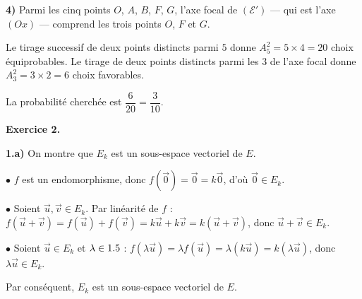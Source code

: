 \begin{illus}
\end{illus}

\smallskip
\noindent\textbf{4)} Parmi les cinq points $O$, $A$, $B$, $F$, $G$, l'axe focal de $(\mathcal{E}')$ — qui est
l'axe $(Ox)$ — comprend les trois points $O$, $F$ et $G$.

Le tirage successif de deux points distincts parmi $5$ donne $A_5^2=5\times4=20$ choix
équiprobables. Le tirage de deux points distincts parmi les $3$ de l'axe focal donne
$A_3^2=3\times2=6$ choix favorables.

La probabilité cherchée est $\dfrac{6}{20}=\boxed{\dfrac{3}{10}}$.

\bigskip
\noindent\textbf{Exercice 2.}

\smallskip
\noindent\textbf{1.a)} On montre que $E_k$ est un sous-espace vectoriel de $E$.

$\bullet$ $f$ est un endomorphisme, donc $f(\vec0)=\vec0=k\vec0$, d'où $\vec0\in E_k$.

$\bullet$ Soient $\vec u,\vec v\in E_k$. Par linéarité de $f$ :
$f(\vec u+\vec v)=f(\vec u)+f(\vec v)=k\vec u+k\vec v=k(\vec u+\vec v)$, donc $\vec u+\vec v\in E_k$.

$\bullet$ Soient $\vec u\in E_k$ et $\lambda\in1.5$ : $f(\lambda\vec u)=\lambda f(\vec u)=\lambda(k\vec u)=k(\lambda\vec u)$,
donc $\lambda\vec u\in E_k$.

Par conséquent, $E_k$ est un sous-espace vectoriel de $E$.

